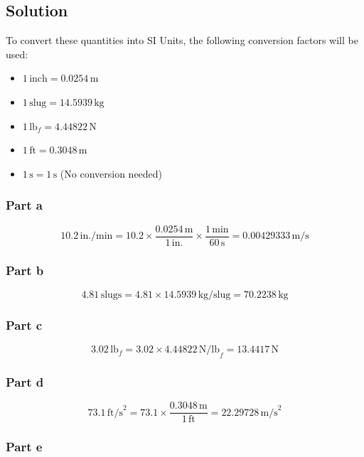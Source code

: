\documentclass{article}
\begin{document}
\subsection*{Solution}

To convert these quantities into SI Units, the following conversion factors will be used:

\begin{itemize}
    \item \( 1 \, \text{inch} = 0.0254 \, \text{m} \)
    \item \( 1 \, \text{slug} = 14.5939 \, \text{kg} \)
    \item \( 1 \, \text{lb}_f = 4.44822 \, \text{N} \)
    \item \( 1 \, \text{ft} = 0.3048 \, \text{m} \)
    \item \( 1 \, \text{s} = 1 \, \text{s} \) (No conversion needed)
\end{itemize}

\subsubsection*{Part a}

\[
10.2 \, \text{in./min} = 10.2 \times \frac{0.0254 \, \text{m}}{1 \, \text{in.}} \times \frac{1 \, \text{min}}{60 \, \text{s}} = 0.00429333 \, \text{m/s}
\]

\subsubsection*{Part b}

\[
4.81 \, \text{slugs} = 4.81 \times 14.5939 \, \text{kg/slug} = 70.2238 \, \text{kg}
\]

\subsubsection*{Part c}

\[
3.02 \, \text{lb}_f = 3.02 \times 4.44822 \, \text{N/lb}_f = 13.4417 \, \text{N}
\]

\subsubsection*{Part d}

\[
73.1 \, \text{ft/s}^2 = 73.1 \times \frac{0.3048 \, \text{m}}{1 \, \text{ft}} = 22.29728 \, \text{m/s}^2
\]

\subsubsection*{Part e}
\end{document}
